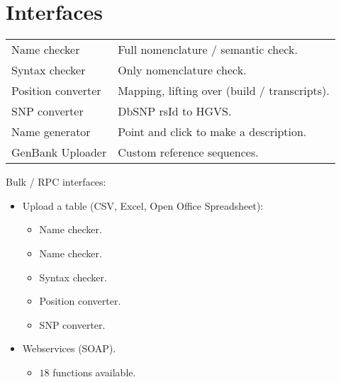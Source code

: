 \documentclass[slidestop]{beamer}
\begin{document}
\section{Interfaces}
\begin{frame}
  
  \begin{tabular}{l@{\ \ -\ \ }l}
    Name checker       & Full nomenclature / semantic check.\\
    Syntax checker     & Only nomenclature check.\\
    Position converter & Mapping, lifting over (build / transcripts).\\
    SNP converter      & DbSNP rsId to HGVS.\\
    Name generator     & Point and click to make a description.\\
    GenBank Uploader   & Custom reference sequences.
  \end{tabular}
  \pause
  \bigskip

  Bulk / RPC interfaces:
  \begin{itemize}
    \item Upload a table (CSV, Excel, Open Office Spreadsheet):
    \begin{itemize}
      \item Name checker.
      \item Name checker.
      \item Syntax checker.
      \item Position converter.
      \item SNP converter.
    \end{itemize}
    \item Webservices (SOAP).
    \begin{itemize}
      \item $18$ functions available.
    \end{itemize}
  \end{itemize}
\end{frame}
\end{document}
